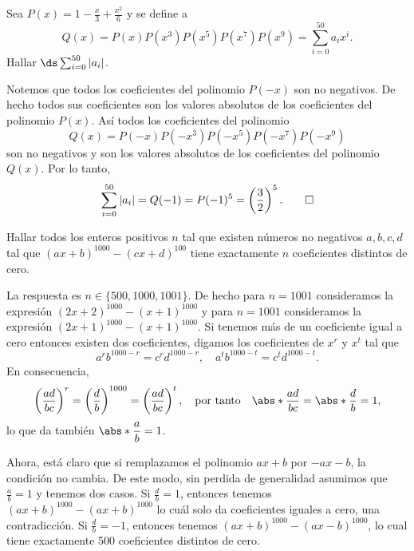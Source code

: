 \begin{example}[AIME, 2016]
    Sea $P(x) = 1 - \frac{x}{3} + \frac{x^2}{6}$ y se define a
    \[
        Q(x) = P(x)P(x^3)P(x^5)P(x^7)P(x^9) = \sum_{i = 0}^{50} a_i x^i.
    \]
    Hallar $\ds \sum_{i = 0}^{50} |a_i|$.
\end{example}
\begin{solution}
    Notemos que todos los coeficientes del polinomio $P(-x)$ son no negativos.
    De hecho todos sus coeficientes son los valores absolutos de los coeficientes del polinomio $P(x)$.
    Así todos los coeficientes del polinomio
    \[
        Q(x) = P(-x)P(- x^3)P(- x^5)P(- x^7)P(- x^9)
    \]
    son no negativos y son los valores absolutos de los coeficientes del polinomio $Q(x)$.
    Por lo tanto,
    \[
        \sum_{i = 0}^{50} |a_i| = Q(-1) = P(-1)^5 = \left(\frac{3}{2}\right)^5. \qedhere
    \]
\end{solution}

\begin{example}
    Hallar todos los enteros positivos $n$ tal que existen números no negativos $a,b,c,d$ tal que $(ax + b)^{1000} - (cx + d)^{100}$ tiene exactamente $n$ coeficientes distintos de cero.
\end{example}
\begin{solution}
    La respuesta es $n \in \{500, 1000, 1001\}$.
    De hecho para $n = 1001$ consideramos la expresión $(2x + 2)^{1000} - (x + 1)^{1000}$ y para $n = 1001$ consideramos la expresión $(2x + 1)^{1000} - (x + 1)^{1000}$.
    Si tenemos más de un coeficiente igual a cero entonces existen dos coeficientes, digamos los coeficientes de $x^r$ y $x^t$ tal que
    \[
        a^r b^{1000 - r} = c^r d^{1000 - r}, \quad a^t b^{1000 - t} = c^t d^{1000 - t}.
    \]
    En consecuencia,
    \[
        \left(\frac{ad}{bc}\right)^r = \left(\frac{d}{b}\right)^{1000} = \left(\frac{ad}{bc}\right)^t, \quad \text{por tanto} \quad \abs*{\frac{ad}{bc}} = \abs*{\frac{d}{b}} = 1,
    \]
    lo que da también $\abs*{\dfrac{a}{b}} = 1$.

    Ahora, está claro que si remplazamos el polinomio $ax + b$ por $-ax - b$, la condición no cambia.
    De este modo, sin perdida de generalidad asumimos que $\frac{a}{b} = 1$ y tenemos dos casos.
    Si $\frac{d}{b} = 1$, entonces tenemos $(ax + b)^{1000} - (ax + b)^{1000}$ lo cuál solo da coeficientes iguales a cero, una contradicción.
    Si $\frac{d}{b} = -1$, entonces tenemos $(ax + b)^{1000} - (ax - b)^{1000}$, lo cual tiene exactamente 500 coeficientes distintos de cero.
\end{solution}

